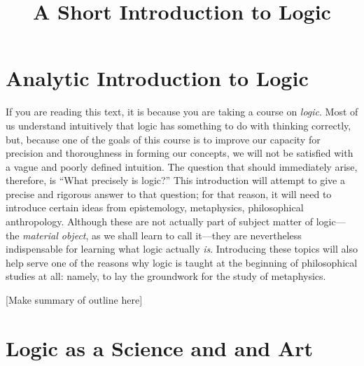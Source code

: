 \documentclass[article,12pt,a4paper,oneside]{memoir}
\begin{document}

    
          
    \title{A Short Introduction to Logic}
          
    \frontmatter
    \maketitle
    
    \hypertarget{analytic-introduction-to-logic}{%
    \chapter*{Analytic Introduction to
    Logic}\label{analytic-introduction-to-logic}}

    If you are reading this text, it is because you are taking a course
    on \emph{logic}. Most of us understand intuitively that logic has
    something to do with thinking correctly, but, because one of the
    goals of this course is to improve our capacity for precision and
    thoroughness in forming our concepts, we will not be satisfied with
    a vague and poorly defined intuition. The question that should
    immediately arise, therefore, is ``What precisely is logic?'' This
    introduction will attempt to give a precise and rigorous answer to
    that question; for that reason, it will need to introduce certain
    ideas from epistemology, metaphysics, philosophical anthropology.
    Although these are not actually part of subject matter of
    logic---the \emph{material object}, as we shall learn to call
    it---they are nevertheless indispensable for learning what logic
    actually \emph{is}. Introducing these topics will also help serve
    one of the reasons why logic is taught at the beginning of
    philosophical studies at all: namely, to lay the groundwork for the
    study of metaphysics.

    {[}Make summary of outline here{]}

    \mainmatter

    \hypertarget{logic-as-a-science-and-and-art}{%
    \chapter{Logic as a Science and and
    Art}\label{logic-as-a-science-and-and-art}}
\end{document}
